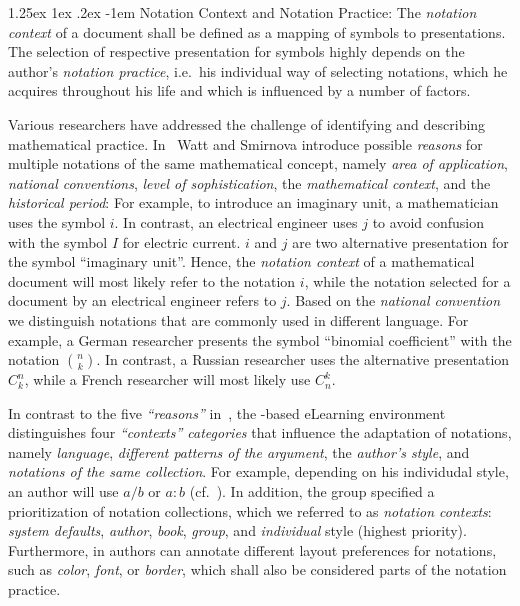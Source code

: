 \documentclass[pdftex,bibtotocnumbered,idxtotoc,11pt]{scrartcl}
\makeatletter
\renewcommand\paragraph{\@startsection{paragraph}{4}{\z@}%
{1.25ex \@plus1ex \@minus.2ex}%
{-1em}%
{\setlength{\parfillskip}{\z@ \@plus 1fil}%
\raggedsection\normalfont\sectfont\nobreak
\size@paragraph\nobreak}}
\makeatother
\begin{document}
\paragraph{Notation Context and Notation Practice:}
The {\emph{notation context}} of a document shall be defined as a mapping of symbols to
presentations. The selection of respective presentation for symbols highly depends on the
author's {\emph{notation practice}}, i.e.\ his individual way of selecting notations,
which he acquires throughout his life and which is influenced by a number of factors.

Various researchers have addressed the challenge of identifying and describing
mathematical practice. In~\cite{ESmStW:Notation} Watt and Smirnova introduce possible
{\emph{reasons}} for multiple notations of the same mathematical concept, namely
{\emph{area of application}}, {\emph{national conventions}}, {\emph{level of
    sophistication}}, the \textit{mathematical context}, and the {\emph{historical
    period}}: For example, to introduce an imaginary unit, a mathematician uses the symbol
$i$. In contrast, an electrical engineer uses $j$ to avoid confusion with the symbol $I$
for electric current. $i$ and $j$ are two alternative presentation for the symbol
``imaginary unit''. Hence, the {\emph{notation context}} of a mathematical document will
most likely refer to the notation $i$, while the notation selected for a document by an
electrical engineer refers to $j$. Based on the {\emph{national convention}} we
distinguish notations that are commonly used in different language. For example, a German
researcher presents the symbol ``binomial coefficient'' with the notation ${n \choose
  k}$. In contrast, a Russian researcher uses the alternative presentation $C_{k}^n$,
while a French researcher will most likely use $C_{n}^k$.

In contrast to the five {\emph{``reasons''}} in~\cite{ESmStW:Notation}, the {\omdoc}-based
eLearning environment {\activemath}~\cite{ManLib:apo05} distinguishes four
{\emph{``contexts'' categories}} that influence the adaptation of notations, namely
{\emph{language}}, {\emph{different patterns of the argument}}, the {\emph{author's
    style}}, and {\emph{notations of the same collection}}. For example, depending on his
individudal style, an author will use $a/b$ or $a:b$ (cf.~\cite{ManLib:apo05}). In
addition, the {\activemath} group specified a prioritization of notation collections,
which we referred to as {\emph{notation contexts}}: {\emph{system defaults}},
{\emph{author}}, {\emph{book}}, {\emph{group}}, and {\emph{individual}} style (highest
priority). Furthermore, in {\activemath} authors can annotate different layout preferences
for notations, such as {\emph{color}}, {\emph{font}}, or {\emph{border}}, which shall also
be considered parts of the notation practice.
\end{document}
